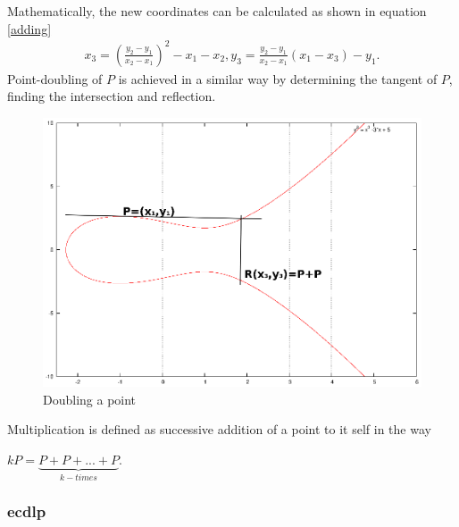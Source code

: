 Mathematically, the new coordinates can be calculated as shown in equation \ref{adding}
\begin{align}\label{adding}
x_3 = (\frac{y_2-y_1}{x_2-x_1})^2-x_1-x_2, y_3=\frac{y_2-y_1}{x_2-x_1}(x_1-x_3)-y_1.
\end{align}   
Point-doubling of $P$ is achieved in a similar way by determining the tangent of $P$, finding the intersection and reflection.
          \begin{figure}[H]
	    \centering
              \includegraphics[width=0.6\linewidth]{figures/doubleEC.eps}
              \caption{Doubling a point}
              \label{fig:ecDouble}
          \end{figure}
% 
% 
Multiplication is defined as successive addition of a point to it self in the way
\begin{center}
 $kP = \underbrace{P+P+...+P}_{k-times}$.
\end{center}


\subsubsection{\gls{ecdlp}}\label{ecdp}

